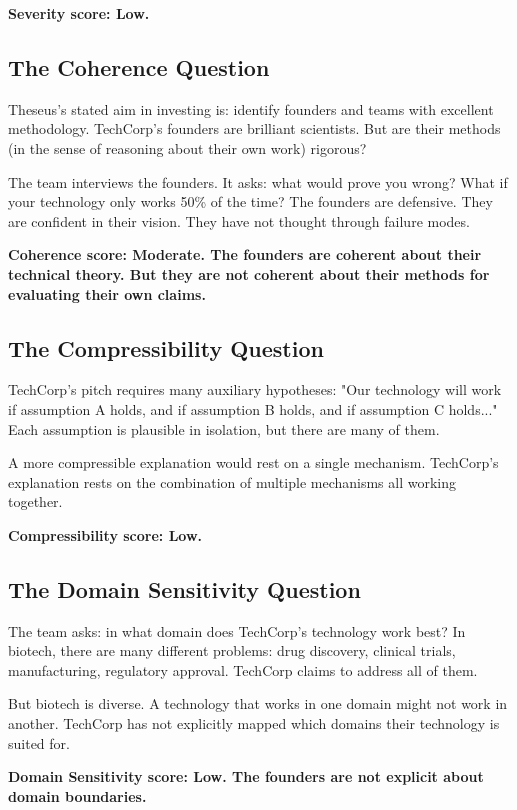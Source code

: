 \documentclass[11pt,letterpaper]{article}
\begin{document}
\textbf{Severity score: Low.}

\subsection*{The Coherence Question}

Theseus's stated aim in investing is: identify founders and teams with excellent methodology. TechCorp's founders are brilliant scientists. But are their methods (in the sense of reasoning about their own work) rigorous?

The team interviews the founders. It asks: what would prove you wrong? What if your technology only works 50\% of the time? The founders are defensive. They are confident in their vision. They have not thought through failure modes.

\textbf{Coherence score: Moderate. The founders are coherent about their technical theory. But they are not coherent about their methods for evaluating their own claims.}

\subsection*{The Compressibility Question}

TechCorp's pitch requires many auxiliary hypotheses: "Our technology will work if assumption A holds, and if assumption B holds, and if assumption C holds..." Each assumption is plausible in isolation, but there are many of them.

A more compressible explanation would rest on a single mechanism. TechCorp's explanation rests on the combination of multiple mechanisms all working together.

\textbf{Compressibility score: Low.}

\subsection*{The Domain Sensitivity Question}

The team asks: in what domain does TechCorp's technology work best? In biotech, there are many different problems: drug discovery, clinical trials, manufacturing, regulatory approval. TechCorp claims to address all of them.

But biotech is diverse. A technology that works in one domain might not work in another. TechCorp has not explicitly mapped which domains their technology is suited for.

\textbf{Domain Sensitivity score: Low. The founders are not explicit about domain boundaries.}
\end{document}
